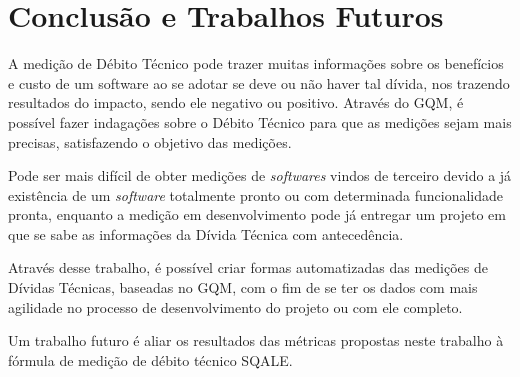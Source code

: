 \chapter[Conclusão e Trabalhos Futuros]{Conclusão e Trabalhos Futuros}
A medição de Débito Técnico pode trazer muitas informações sobre os benefícios e custo de um software ao
se adotar se deve ou não haver tal dívida, nos trazendo resultados do impacto, sendo ele negativo ou positivo. Através do GQM, é possível fazer indagações sobre o Débito Técnico para que as medições sejam mais precisas, satisfazendo o objetivo das medições.


Pode ser mais difícil de obter medições de \textit{softwares} vindos de terceiro devido a já existência de um \textit{software} totalmente pronto ou com determinada funcionalidade pronta, enquanto a medição em desenvolvimento pode já entregar um projeto em que se sabe as informações da Dívida Técnica com antecedência.


Através desse trabalho, é possível criar formas automatizadas das medições de Dívidas Técnicas, baseadas no GQM, com o fim de se ter os dados com mais agilidade no processo de desenvolvimento do projeto ou com ele completo.

Um trabalho futuro é aliar os resultados das métricas propostas neste trabalho à fórmula de medição de débito técnico SQALE.
